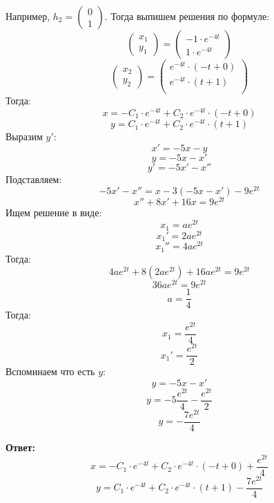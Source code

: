 \documentclass[a4paper,12pt]{article}
\begin{document}
Например, $h_2 = \begin{pmatrix}
0 \\ 1
\end{pmatrix}$. Тогда выпишем решения по формуле:
\[
\begin{pmatrix}
x_1 \\ y_1 
\end{pmatrix}
=
\begin{pmatrix}
-1 \cdot e^{-4t} \\
1 \cdot e^{-4t}
\end{pmatrix}
\]
\[
\begin{pmatrix}
x_2 \\ y_2 
\end{pmatrix}
=
\begin{pmatrix}
e^{-4t} \cdot  (-t + 0)\\
e^{-4t} \cdot (t + 1) \\
\end{pmatrix}
\]
Тогда:
\[
x = -C_1 \cdot  e^{-4t} + C_2 \cdot e^{-4t} \cdot  (-t + 0)
\]
\[
y = C_1 \cdot e^{-4t} + C_2 \cdot e^{-4t} \cdot (t + 1) 
\]
Выразим $y'$:
\[
x' = -5x -y
\]
\[
y = -5x - x'
\]
\[
y' = -5x' -x''
\]
Подставляем:
\[
-5x' -x'' = x - 3( -5x - x') - 9e^{2t}
\]
\[
 x'' + 8x' + 16x = 9e^{2t} 
\]
Ищем решение в виде:
\[
x_1 = a e^{2t}
\]
\[
x_1' =2ae^{2t}
\]
\[
x_1'' = 4ae^{2t}
\]
Тогда:
\[
 4ae^{2t} + 8(2ae^{2t})+ 16 a e^{2t} = 9e^{2t} 
\]
\[
36ae^{2t} = 9e^{2t}
\]
\[
a = \frac{1}{4}
\]
Тогда:
\[
x_1 = \frac{e^{2t}}{4}
\]
\[
x_1' = \frac{e^{2t}}{2}
\]
Вспоминаем что есть $y$:
\[
y = -5x - x'
\]
\[
y = - 5\frac{e^{2t}}{4} - \frac{e^{2t}}{2}
\]
\[
y =- \frac{7e^{2t}}{4}
\]
\begin{center}
\textbf{Ответ: } 
\[
x = -C_1 \cdot  e^{-4t} + C_2 \cdot e^{-4t} \cdot  (-t + 0) +   \frac{e^{2t}}{4} 
\]
\[
y = C_1 \cdot e^{-4t} + C_2 \cdot e^{-4t} \cdot (t + 1)  - \frac{7e^{2t}}{4}
\]
\end{center}
\clearpage
\end{document}
